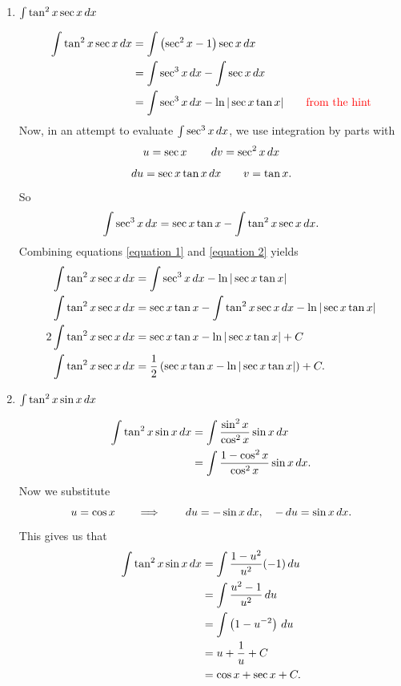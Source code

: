 \documentclass[noinstructornotes]{ximera}
\begin{document}
\begin{problem}
\begin{enumerate}
	\item  $\int \tan^2 x \sec x \,d x$ 
	\begin{freeResponse}
		\begin{align}
		\int \tan^2 x \sec x \,d x
		&= \int \left( \sec^2 x - 1 \right) \sec x \,d x  \nonumber	\\
		&= \int \sec^3 x \,d x - \int \sec x \,d x  		\nonumber	\\
		&= \int \sec^3 x \,d x - \ln | \sec x \tan x| 	\qquad	{\color{red}\text{from the hint}}	\label{equation 1}
		\end{align}
	Now, in an attempt to evaluate $\int \sec^3 x \,d x$, we use integration by parts with
		{\color{red}
		\[
		u = \sec x 				\qquad	\,d v = \sec^2 x \,d x
		\]
		\[
		\,d u = \sec x \tan x \,d x	\qquad	v = \tan x.
		\]
		}
	So
		\begin{equation}\label{equation 2}
		\int \sec^3 x \,d x = \sec x \tan x - \int \tan^2 x \sec x \,d x.
		\end{equation}
	Combining equations \eqref{equation 1} and \eqref{equation 2} yields
		\begin{align*}
		\int \tan^2 x \sec x \,d x &= \int \sec^3 x \,d x - \ln | \sec x \tan x|   \\
		\int \tan^2 x \sec x \,d x &= \sec x \tan x - \int \tan^2 x \sec x \,d x - \ln | \sec x \tan x |  \\
		2 \int \tan^2 x \sec x \,d x &= \sec x \tan x - \ln | \sec x \tan x | + C  \\
		\int \tan^2 x \sec x \,d x &= \frac{1}{2} \left( \sec x \tan x - \ln | \sec x \tan x | \right) + C.
		\end{align*}
	\end{freeResponse}
	
	
	
	\item  $\int \tan^2 x \sin x \,d x$
	\begin{freeResponse}
		\begin{align*}
		\int \tan^2 x \sin x \,d x
		&= \int \frac{\sin^2 x}{\cos^2 x} \sin x \,d x  \\
		&= \int \frac{1-\cos^2 x}{\cos^2 x} \sin x \,d x.
		\end{align*}
	Now we substitute
		{\color{red}
		\[
		u = \cos x 		\qquad	\Longrightarrow		\qquad	\,d u = - \sin x \,d x, \quad - \,d u = \sin x \,d x.
		\]
		}
	This gives us that
		\begin{align*}
		\int \tan^2 x \sin x \,d x
		&= \int \frac{1-u^2}{u^2} (-1) \,d u  \\
		&= \int \frac{u^2 - 1}{u^2} \,d u  \\
		&= \int \left( 1 - u^{-2} \right) \,d u  \\
		&= u + \frac{1}{u} + C  \\
		&= \cos x + \sec x + C.
		\end{align*}
	\end{freeResponse}
	
	\end{enumerate}
	
\end{problem}
\end{document}
